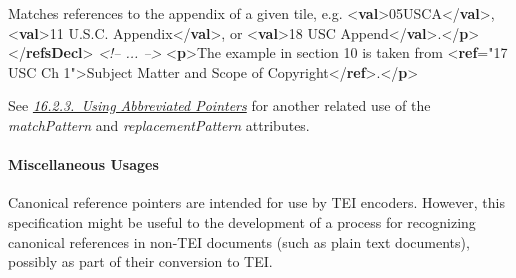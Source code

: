 \begin{shaded}
\mbox{}\newline 
{}\mbox{}\newline 
\hspace*{1em}Matches references to the appendix of a given tile,\mbox{}\newline 
\hspace*{1em}\hspace*{1em}\hspace*{1em}\hspace*{1em} e.g. {<\textbf{val}>}05USCA{</\textbf{val}>}, {<\textbf{val}>}11 U.S.C. Appendix{</\textbf{val}>},\mbox{}\newline 
\hspace*{1em}\hspace*{1em}\hspace*{1em}\hspace*{1em} or {<\textbf{val}>}18 USC Append{</\textbf{val}>}.{</\textbf{p}>}\mbox{}\newline 
{}\mbox{}\newline 
{</\textbf{refsDecl}>}\mbox{}\newline 
\textit{<!-- ... -->}\mbox{}\newline 
{<\textbf{p}>}The example in section 10 is taken\mbox{}\newline 
 from {<\textbf{ref}\hspace*{1em}{cRef}="{17 USC Ch 1}">}Subject Matter and Scope of\mbox{}\newline 
\hspace*{1em}\hspace*{1em} Copyright{</\textbf{ref}>}.{</\textbf{p}>}\end{shaded}\egroup\par \par
See \textit{\hyperref[SAPU]{16.2.3.\ Using Abbreviated Pointers}} for another related use of the {\itshape matchPattern} and {\itshape replacementPattern} attributes.
\paragraph[{Miscellaneous Usages}]{Miscellaneous Usages}\label{SACRmu}\par
Canonical reference pointers are intended for use by TEI encoders. However, this specification might be useful to the development of a process for recognizing canonical references in non-TEI documents (such as plain text documents), possibly as part of their conversion to TEI.
